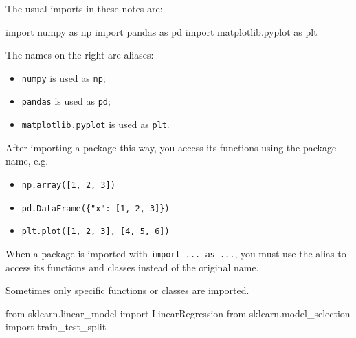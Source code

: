 \documentclass[
  letterpaper,
  DIV=11,
  numbers=noendperiod]{scrreprt}
\newenvironment{Shaded}{\begin{snugshade}}{\end{snugshade}}
\newcommand{\ImportTok}[1]{\textcolor[rgb]{0.00,0.46,0.62}{#1}}
\newcommand{\NormalTok}[1]{\textcolor[rgb]{0.00,0.23,0.31}{#1}}
\providecommand{\tightlist}{%
  \setlength{\itemsep}{0pt}\setlength{\parskip}{0pt}}
\theoremstyle{definition}
\theoremstyle{definition}
\theoremstyle{plain}
\theoremstyle{plain}
\theoremstyle{remark}
\begin{document}
The usual imports in these notes are:

\begin{Shaded}
\begin{Highlighting}[]
\ImportTok{import}\NormalTok{ numpy }\ImportTok{as}\NormalTok{ np}
\ImportTok{import}\NormalTok{ pandas }\ImportTok{as}\NormalTok{ pd}
\ImportTok{import}\NormalTok{ matplotlib.pyplot }\ImportTok{as}\NormalTok{ plt}
\end{Highlighting}
\end{Shaded}

The names on the right are aliases:

\begin{itemize}
\tightlist
\item
  \texttt{numpy} is used as \texttt{np};
\item
  \texttt{pandas} is used as \texttt{pd};
\item
  \texttt{matplotlib.pyplot} is used as \texttt{plt}.
\end{itemize}

After importing a package this way, you access its functions using the
package name, e.g.

\begin{itemize}
\tightlist
\item
  \texttt{np.array({[}1,\ 2,\ 3{]})}
\item
  \texttt{pd.DataFrame(\{"x":\ {[}1,\ 2,\ 3{]}\})}
\item
  \texttt{plt.plot({[}1,\ 2,\ 3{]},\ {[}4,\ 5,\ 6{]})}
\end{itemize}

\begin{tcolorbox}[enhanced jigsaw, arc=.35mm, bottomrule=.15mm, bottomtitle=1mm, breakable, colback=white, colbacktitle=quarto-callout-note-color!10!white, colframe=quarto-callout-note-color-frame, coltitle=black, left=2mm, leftrule=.75mm, opacityback=0, opacitybacktitle=0.6, rightrule=.15mm, title=\textcolor{quarto-callout-note-color}{\faInfo}\hspace{0.5em}{Note}, titlerule=0mm, toprule=.15mm, toptitle=1mm]

When a package is imported with \texttt{import\ ...\ as\ ...}, you must
use the alias to access its functions and classes instead of the
original name.

\end{tcolorbox}

Sometimes only specific functions or classes are imported.

\begin{Shaded}
\begin{Highlighting}[]
\ImportTok{from}\NormalTok{ sklearn.linear\_model }\ImportTok{import}\NormalTok{ LinearRegression}
\ImportTok{from}\NormalTok{ sklearn.model\_selection }\ImportTok{import}\NormalTok{ train\_test\_split}
\end{Highlighting}
\end{Shaded}
\end{document}
